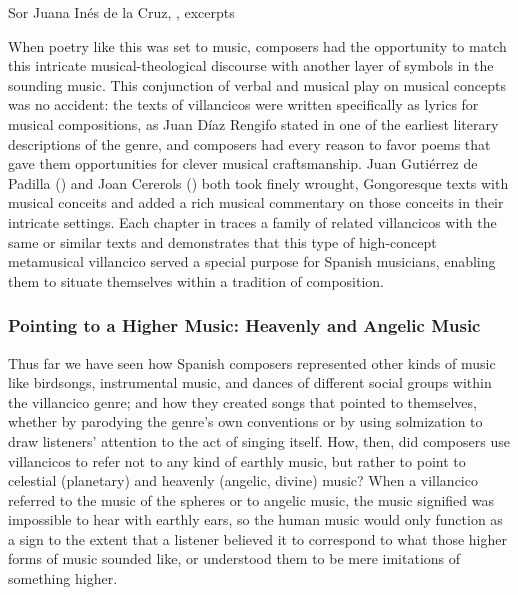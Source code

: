 
{Sor Juana Inés de la Cruz, ,
excerpts}

When poetry like this was set to music, composers had the opportunity to match
this intricate musical-theological discourse with another layer of symbols in
the sounding music.
This conjunction of verbal and musical play on musical concepts was no
accident: the texts of villancicos were written specifically as lyrics for
musical compositions, as Juan Díaz Rengifo stated in one of the earliest
literary descriptions of the genre, and composers had every reason to favor
poems that gave them opportunities for clever musical craftsmanship.%
    \Autocite{Rengifo:ArteMetrica}
Juan Gutiérrez de Padilla () and Joan Cererols
() both took finely wrought, Gongoresque texts with
musical conceits and added a rich musical commentary on those conceits in their
intricate settings.
Each chapter in  traces a family of related
villancicos with the same or similar texts and demonstrates that this type of
high-concept metamusical villancico served a special purpose for Spanish
musicians, enabling them to situate themselves within a tradition of
composition.



\subsubsection{Pointing to a Higher Music: Heavenly and Angelic Music}

Thus far we have seen how Spanish composers represented other kinds of music
like birdsongs, instrumental music, and dances of different social groups
within the villancico genre; and how they created songs that pointed to
themselves, whether by parodying the genre's own conventions or by using
solmization to draw listeners' attention to the act of singing itself.
How, then, did composers use villancicos to refer not to any kind of earthly
music, but rather to point to celestial (planetary) and heavenly (angelic,
divine) music?
When a villancico referred to the music of the spheres or to angelic music, the
music signified was impossible to hear with earthly ears, so the human music
would only function as a sign to the extent that a listener believed it to
correspond to what those higher forms of music sounded like, or understood them
to be mere imitations of something higher.

